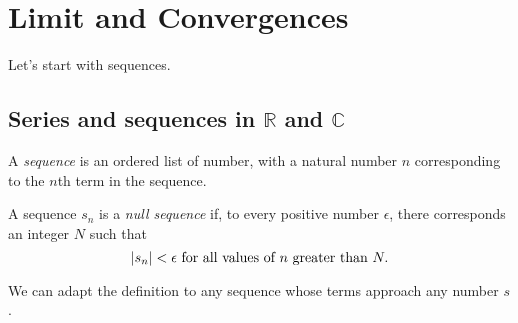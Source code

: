 \documentclass[main.tex]{subfiles}
\begin{document}
	\section{Limit and Convergences}
	Let's start with sequences.
	\subsection{Series and sequences in $\mathbb{R}$ and $\mathbb{C}$}
	\begin{definition}
		A \textit{sequence} is an ordered list of number, with a natural number $n$ corresponding to the $n$th term in the sequence.
	\end{definition}
	\begin{definition}
		A sequence $s_n$ is a \textit{null sequence} if, to every positive number $\epsilon$, there corresponds an integer $N$ such that
		\begin{equation*}
		\abs*{s_n} < \epsilon \text{ for all values of $n$ greater than } N.
		\end{equation*}
	\end{definition}
	
	We can adapt the definition to any sequence whose terms approach any number $s$.
	
\end{document}
